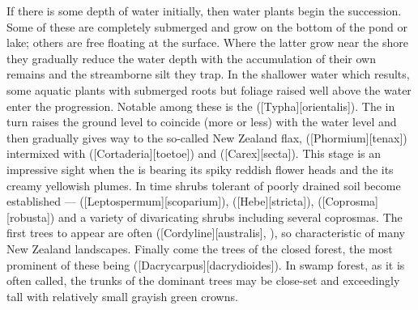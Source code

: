 If there is some depth of water initially, then water plants begin the succession.
Some of these are completely submerged and grow on the bottom of the pond or lake; others are free floating at the surface.
Where the latter grow near the shore they gradually reduce the water depth with the accumulation of their own remains and the streamborne silt they trap.
In the shallower water which results, some aquatic plants with submerged roots but foliage raised well above the water enter the progression.
Notable among these is the  ([Typha][orientalis]).
The  in turn raises the ground level to coincide (more or less) with the water level and then gradually gives way to the so-called New Zealand flax,  ([Phormium][tenax]) intermixed with  ([Cortaderia][toetoe]) and  ([Carex][secta]).
This stage is an impressive sight when the  is bearing its spiky reddish flower heads and the  its creamy yellowish plumes.
In time shrubs tolerant of poorly drained soil become established ---  ([Leptospermum][scoparium]),  ([Hebe][stricta]),  ([Coprosma][robusta]) and a variety of divaricating shrubs including several coprosmas.
The first trees to appear are often  ([Cordyline][australis], ), so characteristic of many New Zealand landscapes.
Finally come the trees of the closed forest, the most prominent of these being  ([Dacrycarpus][dacrydioides]).
In  swamp forest, as it is often called, the trunks of the dominant trees may be close-set and exceedingly tall with relatively small grayish green crowns.
